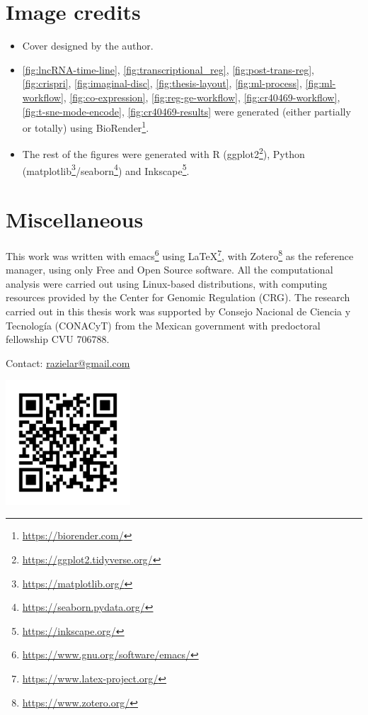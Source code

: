 \clearpage

\section{Image credits}
\label{sec:image_credits}

\begin{itemize}

\item Cover designed by the author.

\item \autoref{fig:lncRNA-time-line}, \autoref{fig:transcriptional_reg}, \autoref{fig:post-trans-reg}, \autoref{fig:crispri}, \autoref{fig:imaginal-disc}, \autoref{fig:thesis-layout}, \autoref{fig:ml-process}, \autoref{fig:ml-workflow}, \autoref{fig:co-expression}, \autoref{fig:reg-ge-workflow}, \autoref{fig:cr40469-workflow}, \autoref{fig:t-sne-mode-encode}, \autoref{fig:cr40469-results}  were generated (either partially or totally) using BioRender\footnote{\url{https://biorender.com/}}. 

\item The rest of the figures were generated with R (ggplot2\footnote{\url{https://ggplot2.tidyverse.org/}}), Python (matplotlib\footnote{\url{https://matplotlib.org/}}/seaborn\footnote{\url{https://seaborn.pydata.org/}}) and Inkscape\footnote{\url{https://inkscape.org/}}. 

\end{itemize}

\clearpage

\section[Miscellaneous]{Miscellaneous}

This work was written with emacs\footnote{\url{https://www.gnu.org/software/emacs/}} using  \LaTeX\/\footnote{\url{https://www.latex-project.org/}}, with Zotero\footnote{\url{https://www.zotero.org/}} as the reference manager, using only Free and Open Source software. 
All the computational analysis were carried out using Linux-based distributions, with computing resources provided by the Center for Genomic Regulation (CRG).  The research carried out in this thesis work was supported by Consejo Nacional de Ciencia y Tecnología (CONACyT) from the Mexican government with predoctoral fellowship CVU 706788.  

\begin{center}
Contact: \href{mailto:razielar@gmail.com}{razielar@gmail.com}
\end{center}

\vspace*{\fill}
\begin{center}
\includegraphics[width=0.35\textwidth]{img/appendix/qr_code/razielar-PhD-thesis-qrc-code.png}
\end{center}
\vspace*{\fill}

